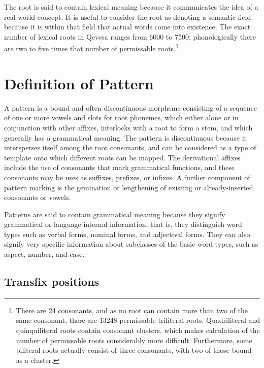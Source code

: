 \documentclass[grammar]{subfiles}
\begin{document}
  The root is said to contain lexical meaning because it communicates the idea of a real-world concept. It is useful to consider the root as denoting a semantic field because it is within that field that actual words come into existence. The exact number of lexical roots in Qevesa ranges from 6000 to 7500; phonologically there are two to five times that number of permissable roots.\footnote{There are 24 consonants, and as no root can contain more than two of the same consonant, there are 13248\footnotemark{} permissable triliteral roots. Quadriliteral and quinquiliteral roots contain consonant clusters, which makes calculation of the number of permissable roots considerably more difficult. Furthermore, some biliteral roots actually consist of three consonants, with two of those bound as a cluster. }



  \section{Definition of Pattern}
  \label{sec:definition_of_pattern}

  A pattern is a bound and often discontinuous morpheme consisting of a sequence of one or more vowels and slots for root phonemes, which either alone or in conjunction with other affixes, interlocks with a root to form a stem, and which generally has a grammatical meaning. The pattern is discontinuous because it intersperses itself among the root consonants, and can be considered as a type of template onto which different roots can be mapped. The derivational affixes include the use of consonants that mark grammatical functions, and	these consonants may be uses as suffixes, prefixes, or infixes. A further component of pattern marking is the gemination or lengthening of existing or already-inserted consonants or vowels.

  Patterns are said to contain grammatical meaning because they signify grammatical or language-internal information; that is, they distinguish word types such as verbal forms, nominal forms, and adjectival forms. They can also signify very specific information about subclasses of the basic word types, such as aspect, number, and case.

  \subsection{Transfix positions}
  \label{ssec:transfix_positions}
\end{document}
